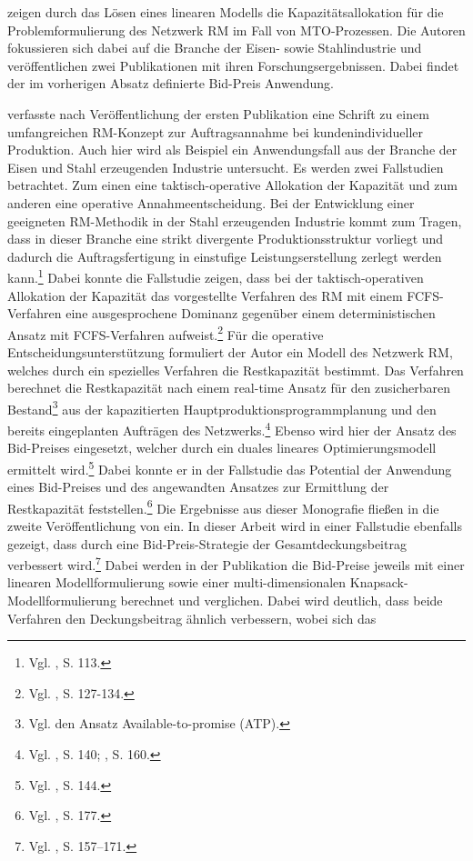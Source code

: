
\cite{rehkopf:2005aa} zeigen durch das Lösen eines linearen Modells die Kapazitätsallokation für die Problemformulierung des Netzwerk RM im Fall von MTO-Prozessen. Die Autoren fokussieren sich dabei auf die Branche der Eisen- sowie Stahlindustrie und veröffentlichen zwei Publikationen mit ihren Forschungsergebnissen. Dabei findet der im vorherigen Absatz definierte Bid-Preis Anwendung. 

\cite{rehkopf2007revenue} verfasste nach Veröffentlichung der ersten Publikation eine Schrift zu einem umfangreichen RM-Konzept zur Auftragsannahme bei kundenindividueller Produktion. Auch hier wird als Beispiel ein Anwendungsfall aus der Branche der Eisen und Stahl erzeugenden Industrie untersucht. Es werden zwei Fallstudien betrachtet. Zum einen eine taktisch-operative Allokation der Kapazität und zum anderen eine operative Annahmeentscheidung. Bei der Entwicklung einer geeigneten RM-Methodik in der Stahl erzeugenden Industrie kommt zum Tragen, dass in dieser Branche eine strikt divergente Produktionsstruktur vorliegt und dadurch die Auftragsfertigung in einstufige Leistungserstellung zerlegt werden kann.\footnote{Vgl. \cite{rehkopf2007revenue}, S. 113.} Dabei konnte die Fallstudie zeigen, dass bei der taktisch-operativen Allokation der Kapazität das vorgestellte Verfahren des RM mit einem FCFS-Verfahren eine ausgesprochene Dominanz gegenüber einem deterministischen Ansatz mit FCFS-Verfahren aufweist.\footnote{Vgl. \cite{rehkopf2007revenue}, S. 127-134.} Für die operative Entscheidungsunterstützung formuliert der Autor ein Modell des Netzwerk RM, welches durch ein spezielles Verfahren die Restkapazität bestimmt. Das Verfahren berechnet die Restkapazität nach einem real-time Ansatz für den zusicherbaren Bestand\footnote{Vgl. den Ansatz \glqq Available-to-promise (ATP)\grqq.} aus der kapazitierten Hauptproduktionsprogrammplanung und den bereits eingeplanten Aufträgen des Netzwerks.\footnote{Vgl. \cite{rehkopf2007revenue}, S. 140; \cite{Spengler:2007aa}, S. 160.} Ebenso wird hier der Ansatz des Bid-Preises eingesetzt, welcher durch ein duales lineares Optimierungsmodell ermittelt wird.\footnote{Vgl. \cite{rehkopf2007revenue}, S. 144.} Dabei konnte er in der Fallstudie das Potential der Anwendung eines Bid-Preises und des angewandten Ansatzes zur Ermittlung der Restkapazität feststellen.\footnote{Vgl. \cite{rehkopf2007revenue}, S. 177.} Die Ergebnisse aus dieser Monografie fließen in die zweite Veröffentlichung von \cite{Spengler:2007aa} ein. In dieser Arbeit wird in einer Fallstudie ebenfalls gezeigt, dass durch eine Bid-Preis-Strategie der Gesamtdeckungsbeitrag verbessert wird.\footnote{Vgl. \cite{Spengler:2007aa}, S. 157–171.} Dabei werden in der Publikation die Bid-Preise jeweils mit einer linearen Modellformulierung sowie einer multi-dimensionalen Knapsack-Modell\-for\-mu\-lier\-ung berechnet und verglichen. Dabei wird deutlich, dass beide Verfahren den Deckungsbeitrag ähnlich verbessern, wobei sich das 